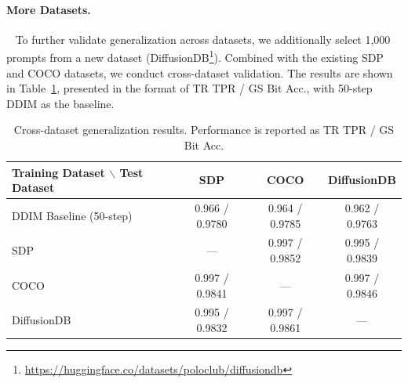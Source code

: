 \documentclass{article}
\begin{document}
\begin{table}[ht]
\centering
\caption{Performance of naive inversion and FARI on SDXL-Turbo.}
\label{tab:sdxl-turbo}
\end{table}

\paragraph{More Datasets.}~ To further validate generalization across datasets, we additionally select 1,000 prompts from a new dataset (DiffusionDB\footnote{\url{https://huggingface.co/datasets/poloclub/diffusiondb}}). Combined with the existing SDP and COCO datasets, we conduct cross-dataset validation. The results are shown in Table~\ref{tab:cross_dataset}, presented in the format of TR TPR / GS Bit Acc., with 50-step DDIM as the baseline.

\begin{table}[ht]
\centering
\caption{Cross-dataset generalization results. Performance is reported as TR TPR / GS Bit Acc.}
\label{tab:cross_dataset}
\begin{tabular}{lccc}
\toprule
Training Dataset $\backslash$ Test Dataset & SDP & COCO & DiffusionDB \\
\midrule
DDIM Baseline (50-step) & 0.966 / 0.9780 & 0.964 / 0.9785 & 0.962 / 0.9763 \\
\midrule
SDP & --- & 0.997 / 0.9852 & 0.995 / 0.9839 \\
COCO & 0.997 / 0.9841 & --- & 0.997 / 0.9846 \\
DiffusionDB & 0.995 / 0.9832 & 0.997 / 0.9861 & --- \\
\bottomrule
\end{tabular}
\end{table}
\end{document}

